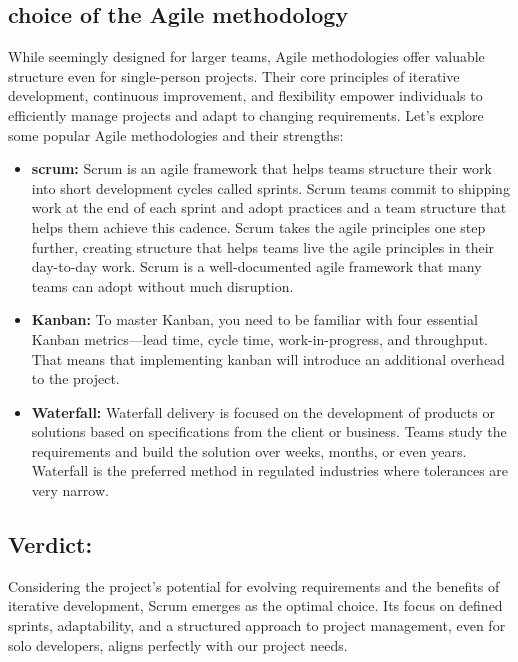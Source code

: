 \subsection*{choice of the Agile methodology}
While seemingly designed for larger teams, Agile methodologies\cite{webArticle0} offer valuable structure even for single-person projects. Their core principles of iterative development, continuous improvement, and flexibility empower individuals to efficiently manage projects and adapt to changing requirements.
Let's explore some popular Agile methodologies and their strengths:
\begin{itemize}
    \item \textbf{scrum:} Scrum is an agile framework that helps teams structure their work into short development cycles called sprints. Scrum teams commit to shipping work at the end of each sprint and adopt practices and a team structure that helps them achieve this cadence. Scrum takes the agile principles one step further, creating structure that helps teams live the agile principles in their day-to-day work. Scrum is a well-documented agile framework that many teams can adopt without much disruption.
    \item \textbf{Kanban:} To master Kanban, you need to be familiar with four essential Kanban metrics—lead time, cycle time, work-in-progress, and throughput. That means that implementing kanban will introduce an additional overhead to the project.
    \item \textbf{Waterfall:} Waterfall delivery is focused on the development of products or solutions based on specifications from the client or business. Teams study the requirements and build the solution over weeks, months, or even years. Waterfall is the preferred method in regulated industries where tolerances are very narrow.
\end{itemize}
\subsection*{Verdict:}
Considering the project's potential for evolving requirements and the benefits of iterative development, Scrum emerges as the optimal choice. Its focus on defined sprints, adaptability, and a structured approach to project management, even for solo developers, aligns perfectly with our project needs.

